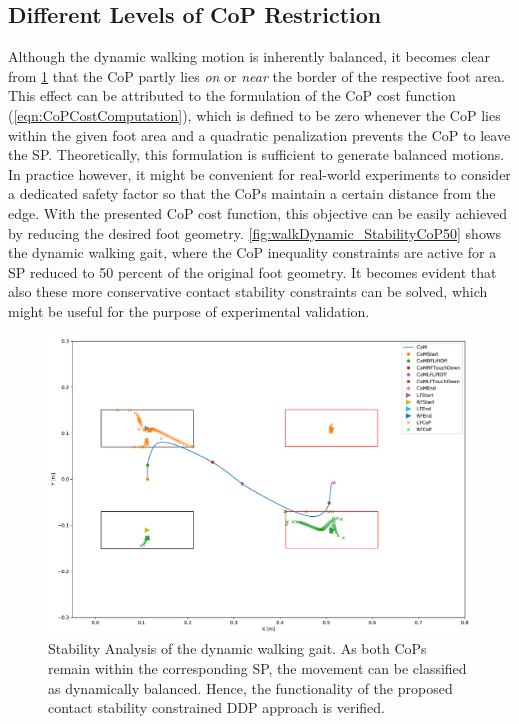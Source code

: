 \subsection{Different Levels of CoP Restriction}
Although the dynamic walking motion is inherently balanced, it becomes clear from \cref{fig:walkDynamic_StabilityCoP100} that the \gls{CoP} partly lies \textit{on} or \textit{near} the border of the respective foot area. This effect can be attributed to the formulation of the \gls{CoP} cost function (\cref{eqn:CoPCostComputation}), which is defined to be zero whenever the \gls{CoP} lies within the given foot area and a quadratic penalization prevents the \gls{CoP} to leave the \gls{SP}. 
Theoretically, this formulation is sufficient to generate balanced motions. 
In practice however, it might be convenient for real-world experiments to consider a dedicated safety factor so that the \gls{CoP}s maintain a certain distance from the edge. With the presented \gls{CoP} cost function, this objective can be easily achieved by reducing the desired foot geometry. 
\cref{fig:walkDynamic_StabilityCoP50} shows the dynamic walking gait, where the \gls{CoP} inequality constraints are active for a \gls{SP} reduced to 50 percent of the original foot geometry. It becomes evident that also these more conservative contact stability constraints can be solved, which might be useful for the purpose of experimental validation. 

\begin{figure}[h!]
\centering	
\includegraphics[width=.7\textwidth]{fig/walkDynamic/StabilityAnalysis_CoP100}
\caption[Stability Analysis of the dynamic walking gait]{Stability Analysis of the dynamic walking gait. As both \gls{CoP}s remain within the corresponding SP, the movement can be classified as dynamically balanced. Hence, the functionality of the proposed contact stability constrained \gls{DDP} approach is verified.}
\label{fig:walkDynamic_StabilityCoP100}
\end{figure} 

